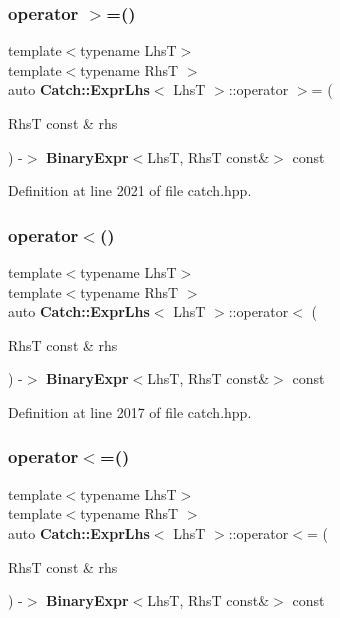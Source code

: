 \subsubsection{operator $>$=()}
{\footnotesize\ttfamily template$<$typename LhsT$>$ \\
template$<$typename RhsT $>$ \\
auto \textbf{ Catch\+::\+Expr\+Lhs}$<$ LhsT $>$\+::operator $>$= (\begin{DoxyParamCaption}\item[{RhsT const \&}]{rhs }\end{DoxyParamCaption}) -\/$>$ \textbf{ Binary\+Expr}$<$LhsT, RhsT const\&$>$ const \hspace{0.3cm}{\ttfamily [inline]}}



Definition at line 2021 of file catch.\+hpp.

\mbox{\label{class_catch_1_1_expr_lhs_afd1ce21cb0be233a63cbdd7724adffea}} 
\subsubsection{operator$<$()}
{\footnotesize\ttfamily template$<$typename LhsT$>$ \\
template$<$typename RhsT $>$ \\
auto \textbf{ Catch\+::\+Expr\+Lhs}$<$ LhsT $>$\+::operator$<$ (\begin{DoxyParamCaption}\item[{RhsT const \&}]{rhs }\end{DoxyParamCaption}) -\/$>$ \textbf{ Binary\+Expr}$<$LhsT, RhsT const\&$>$ const \hspace{0.3cm}{\ttfamily [inline]}}



Definition at line 2017 of file catch.\+hpp.

\mbox{\label{class_catch_1_1_expr_lhs_a918090c28bee54222730159b56240af1}} 
\subsubsection{operator$<$=()}
{\footnotesize\ttfamily template$<$typename LhsT$>$ \\
template$<$typename RhsT $>$ \\
auto \textbf{ Catch\+::\+Expr\+Lhs}$<$ LhsT $>$\+::operator$<$= (\begin{DoxyParamCaption}\item[{RhsT const \&}]{rhs }\end{DoxyParamCaption}) -\/$>$ \textbf{ Binary\+Expr}$<$LhsT, RhsT const\&$>$ const \hspace{0.3cm}{\ttfamily [inline]}}



